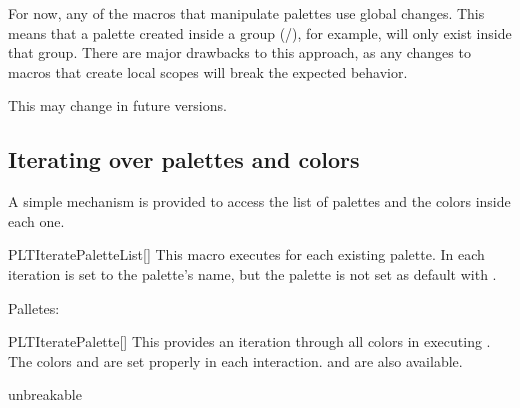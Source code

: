 \documentclass[a4paper, 11pt]{article}
\begin{document}
For now, any of the macros that manipulate palettes use global changes. This means that a palette created inside a group (/), for example, will only exist inside that group. There are major drawbacks to this approach, as any changes to macros that create local scopes will break the expected behavior.

This may change in future versions.

\subsection{Iterating over palettes and colors}

A simple mechanism is provided to access the list of palettes and the colors inside each one.

\begin{macro}{PLTIteratePaletteList}[]
    This macro executes  for each existing palette. In each iteration  is set to the palette's name, but the palette is not set as default with .
\end{macro}

\begin{example}{}
    Palletes:

    \begin{enumerateenumerate}
        \PLTIteratePaletteList{\item \PLTCurrentPalette}
    \end{enumerateenumerate}
\end{example}

\begin{macro}{PLTIteratePalette}[]
    This provides an iteration through all colors in  executing . The colors  and  are set properly in each interaction.  and  are also available.
\end{macro}

\begin{example}{unbreakable}
\end{example}
\end{document}

